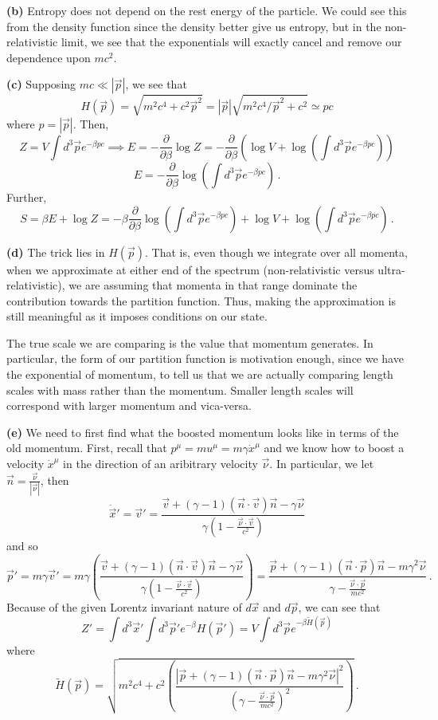 \documentclass[10pt]{article}
\newcommand{\di}[2][]{\frac{\partial #1}{\partial #2}}
\begin{document}
\textbf{(b)} Entropy does not depend on the rest energy of the particle. We could see this from the density function since the density better give us entropy, but in the non-relativistic limit, we see that the exponentials will exactly cancel and remove our dependence upon $mc^{2}$.

\textbf{(c)} Supposing $mc \ll |\vec{p}|$, we see that
\[ H(\vec{p}) = \sqrt{m^{2}c^{4} + c^{2}\vec{p}^{2}} = |\vec{p}|\sqrt{m^{2}c^{4}/\vec{p}^{2} + c^{2}} \simeq pc\]
where $p = |\vec{p}|$. Then, 
\[ Z = V\int d^{3}\vec{p}e^{-\beta pc} \implies E = -\di{\beta}\log Z = -\di{\beta} \left(\log V + \log\left( \int d^{3} \vec{p} e^{-\beta pc}\right) \right) \]
\[ E = -\di{\beta}\log\left(\int d^{3}\vec{p}e^{-\beta pc}\right)\, .\]
Further,
\[ S = \beta E + \log Z = -\beta \di{\beta}\log\left(\int d^{3}\vec{p}e^{-\beta pc}\right) + \log V + \log \left(\int d^{3}\vec{p} e^{-\beta pc}\right) \, . \]

\textbf{(d)} The trick lies in $H(\vec{p})$. That is, even though we integrate over all momenta, when we approximate at either end of the spectrum (non-relativistic versus ultra-relativistic), we are assuming that momenta in that range dominate the contribution towards the partition function. Thus, making the approximation is still meaningful as it imposes conditions on our state.

The true scale we are comparing is the value that momentum generates. In particular, the form of our partition function is motivation enough, since we have the exponential of momentum, to tell us that we are actually comparing length scales with mass rather than the momentum. Smaller length scales will correspond with larger momentum and vica-versa.

\textbf{(e)} We need to first find what the boosted momentum looks like in terms of the old momentum. First, recall that $p^{\mu} = mu^{\mu} = m\gamma \dot{x}^{\mu}$ and we know how to boost a velocity $\dot{x}^{\mu}$ in the direction of an aribitrary velocity $\vec{\nu}$. In particular, we let $\vec{n} = \frac{\vec{\nu}}{|\vec{\nu}|}$, then
\[ \dot{\vec{x}}' = \vec{v}' = \frac{\vec{v}+ (\gamma - 1)(\vec{n}\cdot \vec{v})\vec{n} - \gamma \vec{\nu}}{\gamma(1- \frac{\vec{\nu}\cdot \vec{v}}{c^{2}})} \]
and so
\[ \vec{p}' = m\gamma \vec{v}' = m\gamma \left(\frac{\vec{v}+ (\gamma - 1)(\vec{n}\cdot \vec{v})\vec{n} - \gamma \vec{\nu}}{\gamma(1- \frac{\vec{\nu}\cdot \vec{v}}{c^{2}})}\right) = \frac{\vec{p}+ (\gamma - 1)(\vec{n}\cdot \vec{p})\vec{n} - m\gamma^{2} \vec{\nu}}{\gamma - \frac{\vec{\nu}\cdot \vec{p}}{mc^{2}}} \, .\]
Because of the given Lorentz invariant nature of $d\vec{x}$ and $d\vec{p}$, we can see that
\[ Z' = \int d^{3}\vec{x}'\int d^{3}\vec{p}'e^{-\beta}H(\vec{p}') = V\int d^{3}\vec{p}e^{-\beta \tilde{H}(\vec{p})}\]
where
\[ \tilde{H}(\vec{p}) = \sqrt{m^{2}c^{4} + c^{2}\left(\frac{|\vec{p}+ (\gamma - 1)(\vec{n}\cdot \vec{p})\vec{n} - m\gamma^{2} \vec{\nu}|^{2}}{(\gamma - \frac{\vec{\nu}\cdot \vec{p}}{mc^{2}})^{2}}\right)} \, .\]
\end{document}
